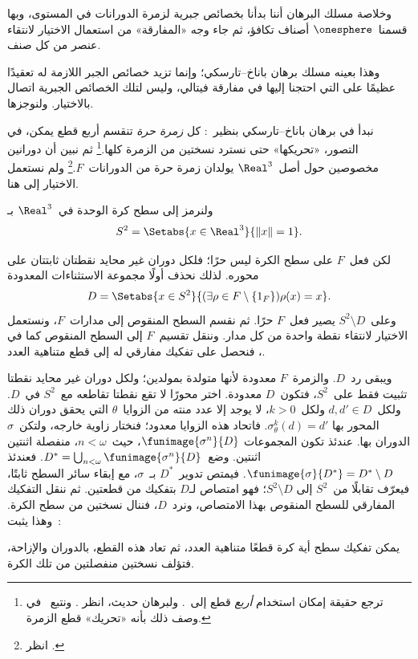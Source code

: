 \documentclass[../../../include/open-logic-section]{subfiles}
\begin{document}
وخلاصة مسلك البرهان أننا بدأنا بخصائص جبرية لزمرة الدورانات في
المستوى، وبها قسمنا~$\onesphere$ أصناف تكافؤ، ثم جاء وجه «المفارقة»
من استعمال الاختيار لانتقاء عنصر من كل صنف.

وهذا بعينه مسلك برهان باناخ--تارسكي؛ وإنما تزيد خصائص الجبر اللازمة له
تعقيدًا عظيمًا على التي احتجنا إليها في مفارقة فيتالي، وليس لتلك
الخصائص الجبرية اتصال بالاختيار. ولنوجزها.

نبدأ في برهان باناخ--تارسكي بنظير~: كل
\emph{زمرة حرة} تنقسم أربع قطع يمكن، في التصور، «تحريكها» حتى نسترد
نسختين من الزمرة كلها.\footnote{ترجع حقيقة إمكان استخدام
\emph{أربع} قطع إلى~\cite{Robinson1947}. ولبرهان حديث، انظر
\citet[Theorem 5.2]{Wagon2016}. ونتبع~\citet[p.~3]{Weston2003} في
وصف ذلك بأنه «تحريك» قطع الزمرة.} ثم نبين أن دورانين مخصوصين حول
أصل~$\Real^3$ يولدان زمرة حرة من الدورانات~$F$.\footnote{انظر
\citet[Theorem 2.1]{Wagon2016}.} ولم نستعمل الاختيار إلى هنا.

ولنرمز إلى سطح كرة الوحدة في~$\Real^3$ بـ
\[
  S^2 = \Setabs{x\in\Real^3}{\lVert x\rVert=1}.
\]

لكن فعل~$F$ على سطح الكرة ليس حرًا؛ فلكل دوران غير محايد نقطتان
ثابتتان على محوره. لذلك نحذف أولًا مجموعة الاستثناءات المعدودة
\[
	D = \Setabs{x \in S^2}{(\exists \rho \in F \setminus \{1_F\})\rho(x)=x}.
\]
وعلى~$S^2 \setminus D$ يصير فعل~$F$ حرًا. ثم نقسم السطح
المنقوص إلى مدارات~$F$، ونستعمل الاختيار لانتقاء نقطة واحدة من كل
مدار. وننقل تقسيم~$F$ إلى السطح المنقوص كما في
، فنحصل على تفكيك مفارقي له إلى قطع متناهية
العدد.

ويبقى رد~$D$. والزمرة~$F$ معدودة لأنها متولدة بمولدين؛ ولكل دوران
غير محايد نقطتا تثبيت فقط على~$S^2$، فتكون~$D$ معدودة. اختر محورًا لا
تقع نقطتا تقاطعه مع~$S^2$ في~$D$. ولكل~$d,d'\in D$ ولكل~$k>0$، لا
يوجد إلا عدد منته من الزوايا~$\theta$ التي يحقق دوران ذلك المحور بها
$\sigma_\theta^k(d)=d'$. فاتحاد هذه الزوايا معدود؛ فنختار زاوية خارجه،
ولتكن~$\sigma$ الدوران بها. عندئذ تكون المجموعات
$\funimage{\sigma^n}{D}$، حيث~$n < \omega$، منفصلة اثنتين اثنتين.
وضع~$D^* = \bigcup_{n < \omega}\funimage{\sigma^n}{D}$. فعندئذ
$\funimage{\sigma}{D^*} = D^* \setminus D$. فيمتص تدوير~$D^*$
بـ~$\sigma$، مع إبقاء سائر السطح ثابتًا، فيعرّف تقابلًا من~$S^2$ إلى
$S^2 \setminus D$؛ فهو امتصاص لـ$D$ بتفكيك من قطعتين. ثم ننقل
التفكيك المفارقي للسطح المنقوص بهذا الامتصاص، ونرد~$D$، فننال نسختين
من سطح الكرة. وهذا يثبت~\citep{Hausdorff1914}:

\begin{thm}
يمكن تفكيك سطح أية كرة قطعًا متناهية العدد، ثم تعاد هذه القطع، بالدوران
والإزاحة، فتؤلف نسختين منفصلتين من تلك الكرة.
\end{thm}
\end{document}
